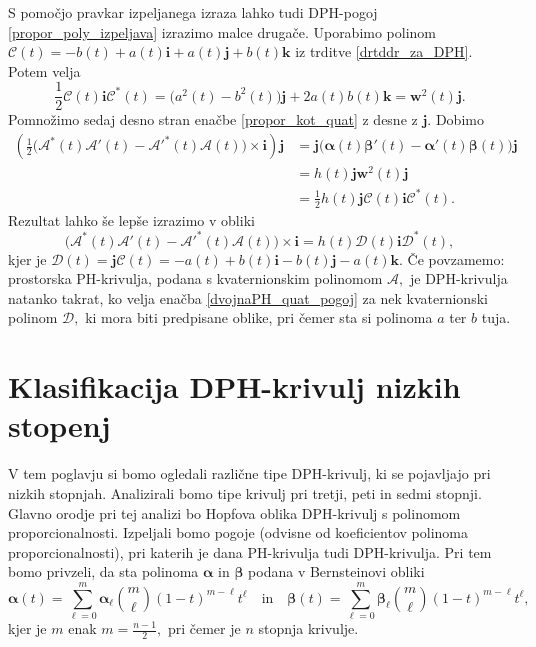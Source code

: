\documentclass[12pt,a4paper,twoside]{article}
\theoremstyle{definition} %
\theoremstyle{plain} %
\theoremstyle{primerstyle}
\numberwithin{equation}{section}  %
\newcommand{\iV}{\mathbf{i}}
\newcommand{\jV}{\mathbf{j}}
\newcommand{\kV}{\mathbf{k}}
\newcommand{\wV}{\mathbf{w}}
\newcommand{\AQ}{\mathcal{A}}
\newcommand{\CQ}{\mathcal{C}}
\newcommand{\DQ}{\mathcal{D}}
\newcommand{\balpha}{\boldsymbol \alpha}
\newcommand{\bbeta}{\boldsymbol \beta}
\begin{document}
S pomočjo pravkar izpeljanega izraza lahko tudi DPH-pogoj \eqref{propor_poly_izpeljava} izrazimo malce drugače. Uporabimo polinom $\CQ(t)=-b(t)+a(t)\iV+a(t)\jV+b(t)\kV$ iz trditve \ref{drtddr_za_DPH}. Potem velja
\begin{equation*}
	\frac{1}{2}\CQ(t)\iV\CQ^*(t)=\big(a^2(t)-b^2(t)\big)\jV+2a(t)b(t)\kV=\wV^2(t)\jV.
\end{equation*}
Pomnožimo sedaj desno stran enačbe \eqref{propor_kot_quat} z desne z $\jV.$ Dobimo
\begin{align*}
	\left(\frac{1}{2}\big(\AQ^*(t)\AQ'(t)-\AQ'^*(t)\AQ(t)\big)\times\iV\right)\jV&=\jV\big(\balpha(t)\bbeta'(t)-\balpha'(t)\bbeta(t)\big)\jV\\
	&=h(t)\jV\wV^2(t)\jV\\
	&=\frac{1}{2}h(t)\jV\CQ(t)\iV\CQ^*(t).
\end{align*}
Rezultat lahko še lepše izrazimo v obliki
\begin{equation}
	\label{dvojnaPH_quat_pogoj}
	\big(\AQ^*(t)\AQ'(t)-\AQ'^*(t)\AQ(t)\big)\times\iV=h(t)\DQ(t)\iV\DQ^*(t),
\end{equation}
kjer je $\DQ(t)=\jV\CQ(t)=-a(t)+b(t)\iV-b(t)\jV-a(t)\kV.$ Če povzamemo: prostorska PH-krivulja, podana s kvaternionskim polinomom $\AQ,$ je DPH-krivulja natanko takrat, ko velja enačba \eqref{dvojnaPH_quat_pogoj} za nek kvaternionski polinom $\DQ,$ ki mora biti predpisane oblike, pri čemer sta si polinoma $a$ ter $b$ tuja.
\clearpage

\section{Klasifikacija DPH-krivulj nizkih stopenj}

V tem poglavju si bomo ogledali različne tipe DPH-krivulj, ki se pojavljajo pri nizkih stopnjah. Analizirali bomo tipe krivulj pri tretji, peti in sedmi stopnji. Glavno orodje pri tej analizi bo Hopfova oblika DPH-krivulj s polinomom proporcionalnosti. Izpeljali bomo pogoje (odvisne od koeficientov polinoma proporcionalnosti), pri katerih je dana PH-krivulja tudi DPH-krivulja. Pri tem bomo privzeli, da sta polinoma $\balpha$ in $\bbeta$ podana v Bernsteinovi obliki
\begin{equation*}
	\balpha(t)=\sum_{\ell=0}^m\balpha_\ell\binom{m}{\ell}(1-t)^{m-\ell}t^\ell\quad\text{in}\quad\bbeta(t)=\sum_{\ell=0}^m\bbeta_\ell\binom{m}{\ell}(1-t)^{m-\ell}t^\ell,
\end{equation*}
kjer je $m$ enak $m=\frac{n-1}{2},$ pri čemer je $n$ stopnja krivulje.
\end{document}
